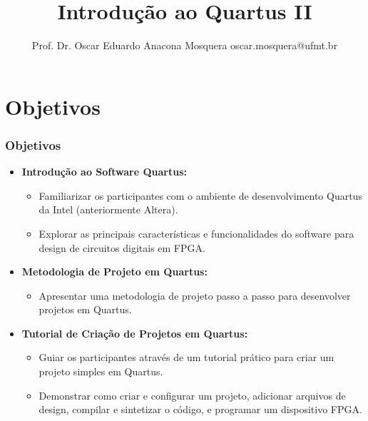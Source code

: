 \documentclass{CPSPresentation}
\title[Minicurso FPGAs]{\huge Introdução ao Quartus II} %
\author[Prof. Dr. Oscar Eduardo Anacona Mosquera]{Prof. Dr. Oscar Eduardo Anacona Mosquera \newline\newline 
\scriptsize{oscar.mosquera@ufmt.br}
}%
\begin{document}
\begin{frame}[plain]
\titlepage

\end{frame}



\section{Objetivos}

\begin{frame}
	\frametitle{Objetivos}
	
	\begin{itemize}
		\item \textbf{Introdução ao Software Quartus:}
		\begin{itemize}
			\item Familiarizar os participantes com o ambiente de desenvolvimento Quartus da Intel (anteriormente Altera).
			\item Explorar as principais características e funcionalidades do software para design de circuitos digitais em FPGA.
		\end{itemize}
		
		\item \textbf{Metodologia de Projeto em Quartus:}
		\begin{itemize}
			\item Apresentar uma metodologia de projeto passo a passo para desenvolver projetos em Quartus.
		\end{itemize}
		
		\item \textbf{Tutorial de Criação de Projetos em Quartus:}
		\begin{itemize}
			\item Guiar os participantes através de um tutorial prático para criar um projeto simples em Quartus.
			\item Demonstrar como criar e configurar um projeto, adicionar arquivos de design, compilar e sintetizar o código, e programar um dispositivo FPGA.
		\end{itemize}
	\end{itemize}
\end{frame}
\end{document}
